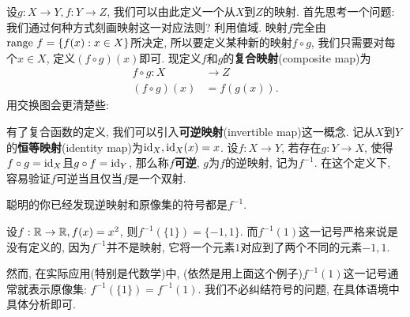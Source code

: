 设$g:X \to Y, f:Y \to Z$, 我们可以由此定义一个从$X$到$Z$的映射. 首先思考一个问题: 
我们通过何种方式刻画映射这一对应法则? 利用值域. 映射$f$完全由$\mathrm{range}~ f = \{f(x): x \in X\}$所决定, 所以要定义某种新的映射$f \circ g$, 我们只需要对每个$x \in X$, 定义$(f \circ g)(x)$即可. 现定义$f$和$g$的\textbf{复合映射}(composite map)为
\begin{align*}
    f \circ g: X &\to Z \\
    (f \circ g)(x) &= f(g(x)).
\end{align*}
用交换图会更清楚些:
\begin{center}
\end{center}

有了复合函数的定义, 我们可以引入\textbf{可逆映射}(invertible map)这一概念. 记从$X$到$Y$的\textbf{恒等映射}(identity map)为$\mathrm{id}_X, \mathrm{id}_X(x) = x$.  设$f:X \to Y$, 若存在$g: Y \to X$, 使得$f \circ g = \mathrm{id}_X$且$g \circ f = \mathrm{id}_Y$, 那么称$f$\textbf{可逆}, $g$为$f$的逆映射, 记为$f^{-1}$. 在这个定义下, 容易验证$f$可逆当且仅当$f$是一个双射. 

聪明的你已经发现逆映射和原像集的符号都是$f^{-1}$. 
\begin{example}
    设$f: \mathbb{R} \to \mathbb{R}, f(x) = x^2$, 则$f^{-1}(\{1\}) = \{-1, 1\}$.
    而$f^{-1}(1)$这一记号严格来说是没有定义的, 因为$f^{-1}$并不是映射, 它将一个元素$1$对应到了两个不同的元素$-1, 1$. 
\end{example}
然而, 在实际应用(特别是代数学)中, (依然是用上面这个例子)$f^{-1}(1)$这一记号通常就表示原像集: $f^{-1}(\{1\}) = f^{-1}(1)$. 我们不必纠结符号的问题, 在具体语境中具体分析即可.

